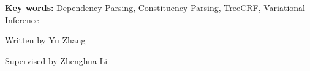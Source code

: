 
\begin{eabstract}
    \vskip 21bp
        {\bf{} Key words: }
    Dependency Parsing,
    Constituency Parsing,
    TreeCRF,
    Variational Inference
\end{eabstract}

\begin{flushright}
    Written by Yu Zhang

    Supervised by Zhenghua Li
\end{flushright}
